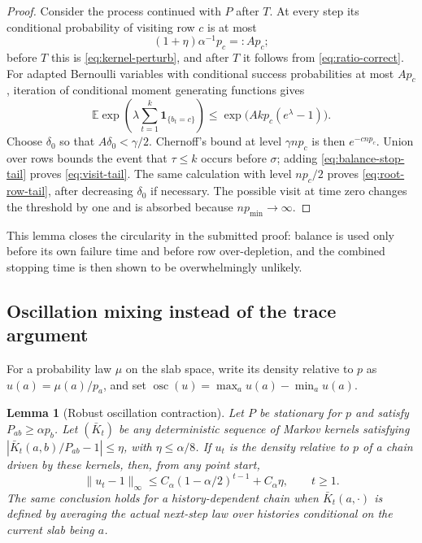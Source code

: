 \documentclass[11pt]{article}
\newcommand{\E}{\mathbb E}
\newcommand{\osc}{\operatorname{osc}}
\newcommand{\1}{\mathbf 1}
\newtheorem{lemma}[theorem]{Lemma}
\theoremstyle{remark}
\begin{document}
\begin{proof}
Consider the process continued with $P$ after $T$.  At every step its
conditional probability of visiting row $c$ is at most
\[
 (1+\eta)\alpha^{-1}p_c=:A p_c;
\]
before $T$ this is \eqref{eq:kernel-perturb}, and after $T$ it follows from
\eqref{eq:ratio-correct}.  For adapted Bernoulli variables with conditional
success probabilities at most $Ap_c$, iteration of conditional moment
generating functions gives
\[
 \E\exp\left(\lambda\sum_{t=1}^k\1_{\{b_t=c\}}\right)
 \le \exp\bigl(Akp_c(e^\lambda-1)\bigr).
\]
Choose $\delta_0$ so that $A\delta_0<\gamma/2$.  Chernoff's bound at level
$\gamma np_c$ is then $e^{-cnp_c}$.  Union over rows bounds the event that
$\tau\le k$ occurs before $\sigma$; adding \eqref{eq:balance-stop-tail}
proves \eqref{eq:visit-tail}.  The same calculation with level $np_c/2$
proves \eqref{eq:root-row-tail}, after decreasing $\delta_0$ if necessary.
The possible visit at time zero changes the threshold by one and is absorbed
because $np_{\min}\to\infty$.
\end{proof}

This lemma closes the circularity in the submitted proof: balance is used
only before its own failure time and before row over-depletion, and the
combined stopping time is then shown to be overwhelmingly unlikely.

\subsection{Oscillation mixing instead of the trace argument}

For a probability law $\mu$ on the slab space, write its density relative to
$p$ as $u(a)=\mu(a)/p_a$, and set
$\osc(u)=\max_a u(a)-\min_a u(a)$.

\begin{lemma}[Robust oscillation contraction]\label{lem:oscillation}
Let $P$ be stationary for $p$ and satisfy
$P_{ab}\ge\alpha p_b$.  Let $(\bar K_t)$ be any deterministic sequence of
Markov kernels satisfying
$|\bar K_t(a,b)/P_{ab}-1|\le\eta$, with $\eta\le\alpha/8$.
If $u_t$ is the density relative to $p$ of a chain driven by these kernels,
then, from any point start,
\begin{equation}\label{eq:osc-bound}
 \|u_t-1\|_\infty
 \le C_\alpha(1-\alpha/2)^{t-1}+C_\alpha\eta,
 \qquad t\ge1.
\end{equation}
The same conclusion holds for a history-dependent chain when
$\bar K_t(a,\cdot)$ is defined by averaging the actual next-step law over
histories conditional on the current slab being $a$.
\end{lemma}
\end{document}
